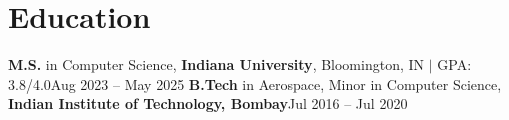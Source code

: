 \section{Education}
  \resumeSubHeadingListStart
    \resumeSubheadingedu
    {\textbf{M.S.} in Computer Science, \textbf{Indiana University}, Bloomington, IN $|$ GPA: 3.8/4.0}{Aug 2023 -- May 2025}
    \vspace{5pt}
    \resumeSubheadingedu
      {\textbf{B.Tech} in Aerospace, Minor in Computer Science, \textbf{Indian Institute of Technology, Bombay}}{Jul 2016 -- Jul 2020}
  \resumeSubHeadingListEnd